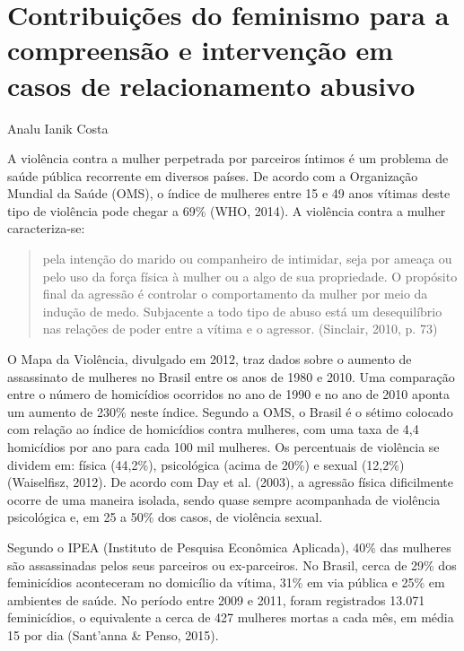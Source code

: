 \setcounter{footnote}{0}
\setcounter{figure}{0}
\setcounter{table}{0}
\chapter*{Contribuições do feminismo para a compreensão e intervenção em casos de relacionamento abusivo}
\begin{flushright}
\begin{small}
    Analu Ianik Costa
\end{small}
\vspace{1cm}
\end{flushright}

A violência contra a mulher perpetrada por parceiros íntimos é um problema de saúde pública recorrente em diversos países. De acordo com a Organização Mundial da Saúde (OMS), o índice de mulheres entre 15 e 49 anos vítimas deste tipo de violência pode chegar a 69\% (WHO, 2014). A violência contra a mulher caracteriza-se:

\begin{quote}
    pela intenção do marido ou companheiro de intimidar, seja por ameaça ou pelo uso da força física à mulher ou a algo de sua propriedade. O propósito final da agressão é controlar o comportamento da mulher por meio da indução de medo. Subjacente a todo tipo de abuso está um desequilíbrio nas relações de poder entre a vítima e o agressor. (Sinclair, 2010, p. 73)
\end{quote}

O Mapa da Violência, divulgado em 2012, traz dados sobre o aumento de assassinato de mulheres no Brasil entre os anos de 1980 e 2010. Uma comparação entre o número de homicídios ocorridos no ano de 1990 e no ano de 2010 aponta um aumento de 230\% neste índice. Segundo a OMS, o Brasil é o sétimo colocado com relação ao índice de homicídios contra mulheres, com uma taxa de 4,4 homicídios por ano para cada 100 mil mulheres. Os percentuais de violência se dividem em: física (44,2\%), psicológica (acima de 20\%) e sexual (12,2\%) (Waiselfisz, 2012). De acordo com Day et al. (2003), a agressão física dificilmente ocorre de uma maneira isolada, sendo quase sempre acompanhada de violência psicológica e, em 25 a 50\% dos casos, de violência sexual.

Segundo o IPEA (Instituto de Pesquisa Econômica Aplicada), 40\% das mulheres são assassinadas pelos seus parceiros ou ex-parceiros. No Brasil, cerca de 29\% dos feminicídios aconteceram no domicílio da vítima, 31\% em via pública e 25\% em ambientes de saúde. No período entre 2009 e 2011, foram registrados 13.071 feminicídios, o equivalente a cerca de 427 mulheres mortas a cada mês, em média 15 por dia (Sant'anna \& Penso, 2015).

